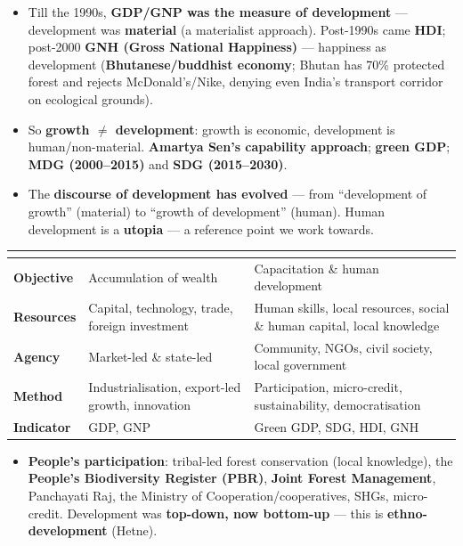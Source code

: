 \begin{KeyConcept}
\begin{itemize}
    \item Till the 1990s, \textbf{GDP/GNP was the measure of development} --- development was \textbf{material} (a materialist approach). Post-1990s came \textbf{HDI}; post-2000 \textbf{GNH (Gross National Happiness)} --- happiness as development (\textbf{Bhutanese/buddhist economy}; Bhutan has 70\% protected forest and rejects McDonald's/Nike, denying even India's transport corridor on ecological grounds).
    \item So \textbf{growth $\neq$ development}: growth is economic, development is human/non-material. \textbf{Amartya Sen's capability approach}; \textbf{green GDP}; \textbf{MDG (2000--2015)} and \textbf{SDG (2015--2030)}.
    \item The \textbf{discourse of development has evolved} --- from ``development of growth'' (material) to ``growth of development'' (human). Human development is a \textbf{utopia} --- a reference point we work towards.
\end{itemize}
\end{KeyConcept}

\begin{ComparisonBox}
\begin{tabularx}{\linewidth}{>{\bfseries}lYY}
 &  &  \\
\midrule
Objective & Accumulation of wealth & Capacitation \& human development \\
Resources & Capital, technology, trade, foreign investment & Human skills, local resources, social \& human capital, local knowledge \\
Agency & Market-led \& state-led & Community, NGOs, civil society, local government \\
Method & Industrialisation, export-led growth, innovation & Participation, micro-credit, sustainability, democratisation \\
Indicator & GDP, GNP & Green GDP, SDG, HDI, GNH \\
\bottomrule
\end{tabularx}
\end{ComparisonBox}

\begin{ExampleBox}
\begin{itemize}
    \item \textbf{People's participation}: tribal-led forest conservation (local knowledge), the \textbf{People's Biodiversity Register (PBR)}, \textbf{Joint Forest Management}, Panchayati Raj, the Ministry of Cooperation/cooperatives, SHGs, micro-credit. Development was \textbf{top-down, now bottom-up} --- this is \textbf{ethno-development} (Hetne).
\end{itemize}
\end{ExampleBox}


